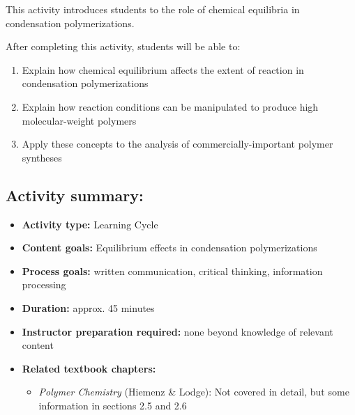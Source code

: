 %
%
%
%

\renewcommand{\figpath}{content/polymchem/stepgrowth/condensation-equilibria/figs}
\renewcommand{\labelbase}{condequilib}

\begin{activity}

\begin{instructornotes}

	This activity introduces students to the role of chemical equilibria in condensation polymerizations.
	
	After completing this activity, students will be able to:
			\begin{enumerate}
				\item Explain how chemical equilibrium affects the extent of reaction in condensation polymerizations
				\item Explain how reaction conditions can be manipulated to produce high molecular-weight polymers
				\item Apply these concepts to the analysis of commercially-important polymer syntheses
			\end{enumerate}
	
			
	\subsection*{Activity summary:}
	\begin{itemize}
		\item \textbf{Activity type:} Learning Cycle
		\item \textbf{Content goals:} Equilibrium effects in condensation polymerizations
		\item \textbf{Process goals:} %
			written communication, critical thinking, information processing
		\item \textbf{Duration:} approx. 45 minutes
		\item \textbf{Instructor preparation required:} none beyond knowledge of relevant content
		\item \textbf{Related textbook chapters:}
			\begin{itemize}
				\item \emph{Polymer Chemistry} (Hiemenz \& Lodge): Not covered in detail, but some information in sections 2.5 and 2.6
			\end{itemize}
	\end{itemize}


\end{instructornotes}
\end{activity}
